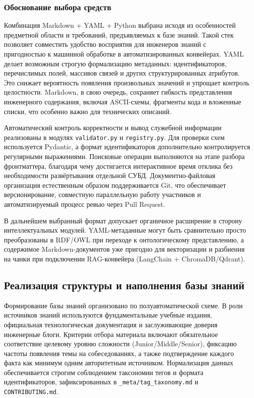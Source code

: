 \subsubsection*{Обоснование выбора средств}

Комбинация Markdown + YAML + Python выбрана исходя из особенностей предметной области и требований, предъявляемых к базе знаний. Такой стек позволяет совместить удобство восприятия для инженеров знаний с пригодностью к машинной обработке в автоматизированных конвейерах. YAML делает возможным строгую формализацию метаданных: идентификаторов, перечислимых полей, массивов связей и других структурированных атрибутов. Это снижает вероятность появления произвольных значений и упрощает контроль целостности. Markdown, в свою очередь, сохраняет гибкость представления инженерного содержания, включая ASCII-схемы, фрагменты кода и вложенные списки, что особенно важно для технических описаний.

Автоматический контроль корректности и вывод служебной информации реализованы в модулях \texttt{validator.py} и \texttt{registry.py}. Для проверки схем используется Pydantic, а формат идентификаторов дополнительно контролируется регулярными выражениями. Поисковые операции выполняются на этапе разбора фронтматтера, благодаря чему достигается интерактивное время отклика без необходимости развёртывания отдельной СУБД. Документно-файловая организация естественным образом поддерживается Git, что обеспечивает версионирование, совместную параллельную работу участников и автоматизируемый процесс ревью через Pull Request.

В дальнейшем выбранный формат допускает органичное расширение в сторону интеллектуальных модулей. YAML-метаданные могут быть сравнительно просто преобразованы в RDF/OWL при переходе к онтологическому представлению, а содержимое Markdown-документов уже пригодно для векторизации и разбиения на чанки при подключении RAG-конвейера (LangChain + ChromaDB/Qdrant).

\subsection{Реализация структуры и наполнения базы знаний}

Формирование базы знаний организовано по полуавтоматической схеме. В роли источников знаний используются фундаментальные учебные издания, официальная технологическая документация и заслуживающие доверия инженерные блоги. Критерии отбора материала включают обязательное соответствие целевому уровню сложности (Junior/Middle/Senior), фиксацию частоты появления темы на собеседованиях, а также подтверждение каждого факта как минимум одним авторитетным источником. Нормализация данных обеспечивается строгим соблюдением таксономии тегов и формата идентификаторов, зафиксированных в \texttt{\_meta/tag\_taxonomy.md} и \texttt{CONTRIBUTING.md}.

